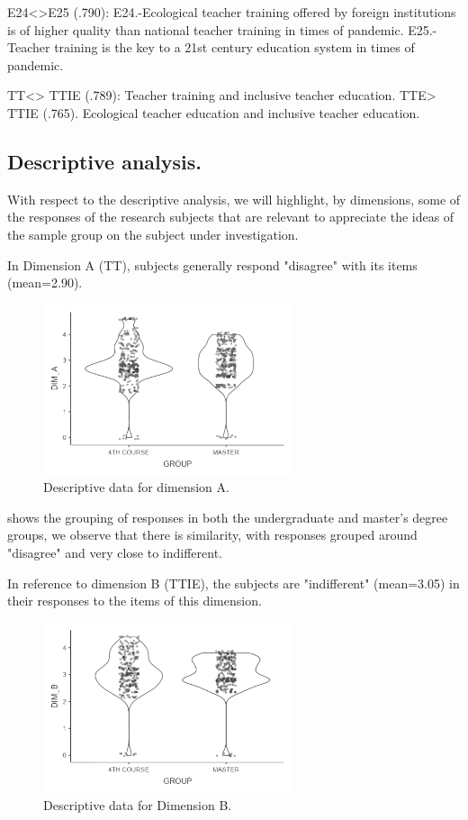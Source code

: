 \documentclass[english]{textolivre}
\begin{document}
E24<>E25 (.790): E24.-Ecological teacher training offered by foreign institutions is of higher quality than national teacher training in times of pandemic. E25.-Teacher training is the key to a 21st century education system in times of pandemic.

TT<> TTIE (.789): Teacher training and inclusive teacher education. TTE> TTIE (.765). Ecological teacher education and inclusive teacher education.

\subsection{Descriptive analysis.}\label{subdescanaly}
With respect to the descriptive analysis, we will highlight, by dimensions, some of the responses of the research subjects that are relevant to appreciate the ideas of the sample group on the subject under investigation.

In Dimension A (TT), subjects generally respond "disagree" with its items (mean=2.90).

\begin{figure}[htbp]
 \centering
 \includegraphics[width=0.65\textwidth]{fig1.pdf}
 \caption{Descriptive data for dimension A.}
 \label{fig1}
\end{figure}

 shows the grouping of responses in both the undergraduate and master's degree groups, we observe that there is similarity, with responses grouped around "disagree" and very close to indifferent.

In reference to dimension B (TTIE), the subjects are "indifferent" (mean=3.05) in their responses to the items of this dimension.

\begin{figure}[htbp]
 \centering
 \includegraphics[width=0.65\textwidth]{fig2.pdf}
 \caption{Descriptive data for Dimension B.}
 \label{fig2}
\end{figure}
\end{document}
